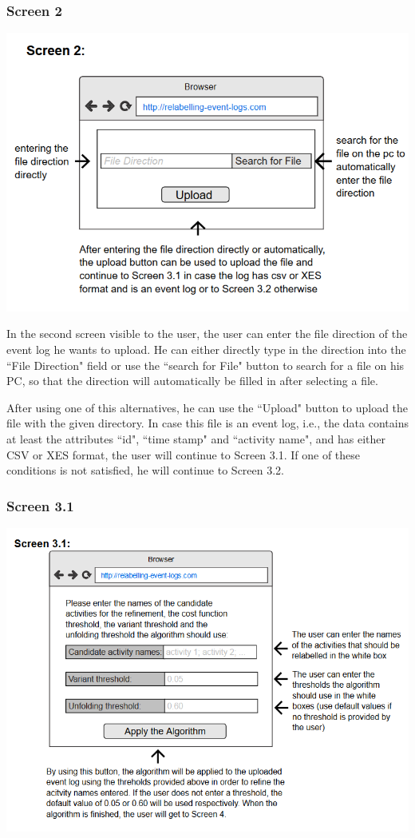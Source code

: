 \documentclass[notitlepage]{article}
\begin{document}
\begin{flushleft}
\subsubsection{Screen 2}

\includegraphics[scale=0.9]{InterfaceMockup2.png}

In the second screen visible to the user, the user can enter the file direction of the event log he wants to upload. He can either directly type in the direction into the ``File Direction" field or use the ``search for File" button to search for a file on his PC, so that the direction will automatically be filled in after selecting a file.

After using one of this alternatives, he can use the ``Upload" button to upload the file with the given directory. In case this file is an event log, i.e., the data contains at least the attributes ``id", ``time stamp" and ``activity name", and has either CSV or XES format, the user will continue to Screen 3.1. If one of these conditions is not satisfied, he will continue to Screen 3.2. 


\subsubsection{Screen 3.1}
\includegraphics[scale=0.9]{InterfaceMockup3-1.png}


\end{flushleft}
\end{document}
